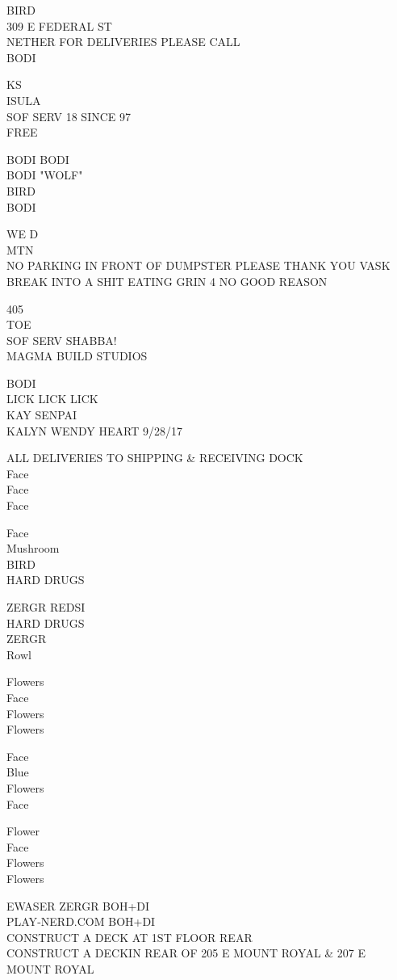 \documentclass[10pt,letterpaper]{article}
\begin{document}
BIRD\\
309 E FEDERAL ST\\
NETHER FOR DELIVERIES PLEASE CALL\\
BODI

KS\\
ISULA\\
SOF SERV 18 SINCE 97\\
FREE

BODI BODI\\
BODI "WOLF"\\
BIRD\\
BODI

WE D\\
MTN\\
NO PARKING IN FRONT OF DUMPSTER PLEASE THANK YOU VASK\\
BREAK INTO A SHIT EATING GRIN 4 NO GOOD REASON

405\\
TOE\\
SOF SERV SHABBA!\\
MAGMA BUILD STUDIOS

BODI\\
LICK LICK LICK\\
KAY SENPAI\\
KALYN WENDY HEART 9/28/17

ALL DELIVERIES TO SHIPPING \& RECEIVING DOCK\\
Face\\
Face\\
Face

Face\\
Mushroom\\
BIRD\\
HARD DRUGS

ZERGR REDSI\\
HARD DRUGS\\
ZERGR\\
Rowl

Flowers\\
Face\\
Flowers\\
Flowers

Face\\
Blue\\
Flowers\\
Face

Flower\\
Face\\
Flowers\\
Flowers

EWASER ZERGR BOH+DI\\
PLAY{-}NERD.COM BOH+DI\\
CONSTRUCT A DECK AT 1ST FLOOR REAR\\
CONSTRUCT A DECKIN REAR OF 205 E MOUNT ROYAL \& 207 E MOUNT ROYAL
\end{document}
